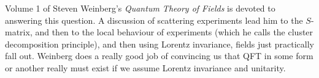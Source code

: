 \documentclass{report}
\theoremstyle{plain}
\theoremstyle{definition}
\theoremstyle{remark}
\begin{document}
    Volume 1 of Steven Weinberg's \emph{Quantum Theory of Fields} is
    devoted to answering this question. A discussion of scattering
    experiments lead him to the $S$-matrix, and then to the local behaviour
    of experiments (which he calls the cluster decomposition principle),
    and then using Lorentz invariance, fields just practically fall out.
    Weinberg does a really good job of convincing us that QFT in some form
    or another really must exist if we assume Lorentz invariance and
    unitarity.
%
\end{document}
